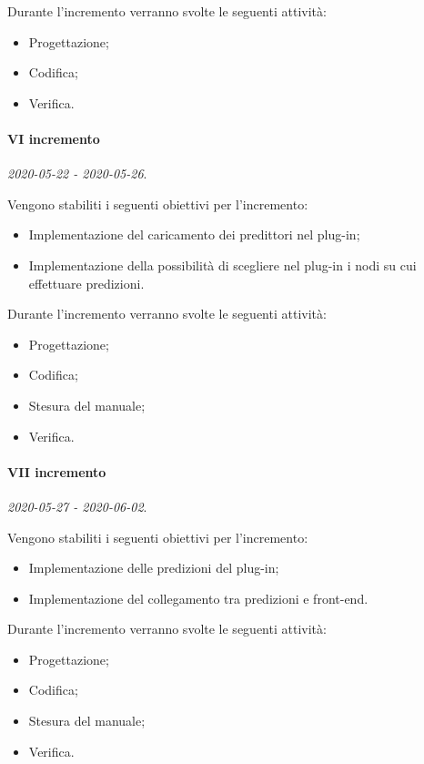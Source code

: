 \documentclass[../piano-di-progetto.tex]{subfiles}
\begin{document}
Durante l'incremento verranno svolte le seguenti attività: 
\begin{itemize}
    \item Progettazione;
    \item Codifica;
    \item Verifica.
\end{itemize}

\paragraph{VI incremento}
\emph{2020-05-22 - 2020-05-26}. 
 
 Vengono stabiliti i seguenti obiettivi per l'incremento:
 \begin{itemize}
     \item Implementazione del caricamento dei predittori nel plug-in;
     \item Implementazione della possibilità di scegliere nel plug-in i nodi su cui effettuare predizioni.
 \end{itemize}

Durante l'incremento verranno svolte le seguenti attività: 
\begin{itemize}
    \item Progettazione;
    \item Codifica;
    \item Stesura del manuale;
    \item Verifica.
\end{itemize}

\paragraph{VII incremento}
\emph{2020-05-27 - 2020-06-02}. 
 
 Vengono stabiliti i seguenti obiettivi per l'incremento:
 \begin{itemize}
    \item Implementazione delle predizioni del plug-in;
    \item Implementazione del collegamento tra predizioni e front-end.

\end{itemize}

Durante l'incremento verranno svolte le seguenti attività: 
\begin{itemize}
    \item Progettazione;
    \item Codifica;
    \item Stesura del manuale;
    \item Verifica.
\end{itemize}
\end{document}
